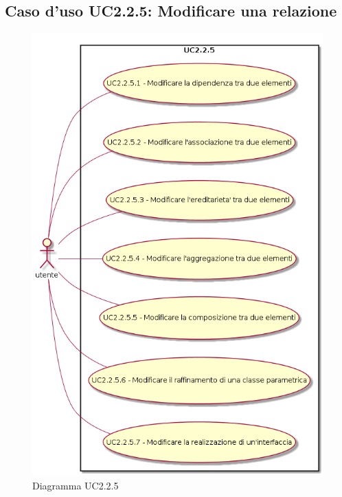 \documentclass[../AnalisiDeiRequisiti.tex]{subfiles}
\begin{document}
			\subsection{Caso d'uso UC2.2.5: Modificare una relazione}
			\begin{figure} [H]
				\centering
				\includegraphics[scale=0.45]{./Figures/UC2-2-5.png}
				\caption{Diagramma UC2.2.5}\label{}
			\end{figure}
\end{document}
